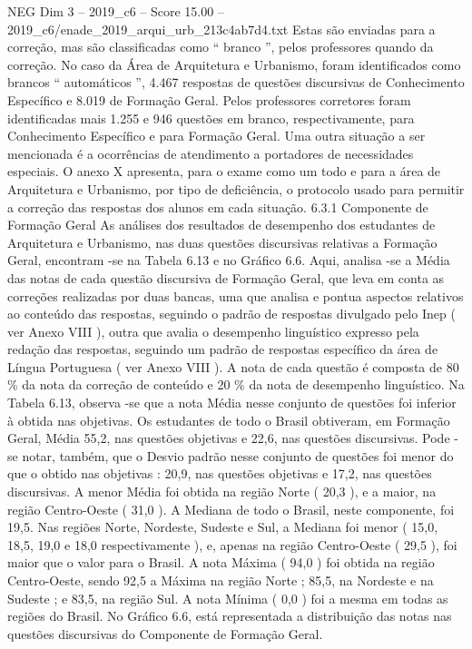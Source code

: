 \begin{textsample}{NEG Dim 3 – 2019\_c6 – Score 15.00 – 2019\_c6/enade\_2019\_arqui\_urb\_213c4ab7d4.txt}
Estas são enviadas para a correção, mas são classificadas como “ branco ”, pelos professores quando da correção.
No caso da Área de Arquitetura e Urbanismo, foram identificados como brancos “ automáticos ”, 4.467 respostas de questões discursivas de Conhecimento Específico e 8.019 de Formação Geral.
Pelos professores corretores foram identificadas mais 1.255 e 946 questões em branco, respectivamente, para Conhecimento Específico e para Formação Geral.
Uma outra situação a ser mencionada é a ocorrências de atendimento a portadores de necessidades especiais.
O anexo X apresenta, para o exame como um todo e para a área de Arquitetura e Urbanismo, por tipo de deficiência, o protocolo usado para permitir a correção das respostas dos alunos em cada situação. 6.3.1 Componente de Formação Geral As análises dos resultados de desempenho dos estudantes de Arquitetura e Urbanismo, nas duas questões discursivas relativas a Formação Geral, encontram -se na Tabela 6.13 e no Gráfico 6.6.
Aqui, analisa -se a Média das notas de cada questão discursiva de Formação Geral, que leva em conta as correções realizadas por duas bancas, uma que analisa e pontua aspectos relativos ao conteúdo das respostas, seguindo o padrão de respostas divulgado pelo Inep ( ver Anexo VIII ), outra que avalia o desempenho linguístico expresso pela redação das respostas, seguindo um padrão de respostas específico da área de Língua Portuguesa ( ver Anexo VIII ).
A nota de cada questão é composta de 80 \% da nota da correção de conteúdo e 20 \% da nota de desempenho linguístico.
Na Tabela 6.13, observa -se que a nota Média nesse conjunto de questões foi inferior à obtida nas objetivas.
Os estudantes de todo o Brasil obtiveram, em Formação Geral, Média 55,2, nas questões objetivas e 22,6, nas questões discursivas.
Pode -se notar, também, que o Desvio padrão nesse conjunto de questões foi menor do que o obtido nas objetivas : 20,9, nas questões objetivas e 17,2, nas questões discursivas.
A menor Média foi obtida na região Norte ( 20,3 ), e a maior, na região Centro-Oeste ( 31,0 ).
A Mediana de todo o Brasil, neste componente, foi 19,5.
Nas regiões Norte, Nordeste, Sudeste e Sul, a Mediana foi menor ( 15,0, 18,5, 19,0 e 18,0 respectivamente ), e, apenas na região Centro-Oeste ( 29,5 ), foi maior que o valor para o Brasil.
A nota Máxima ( 94,0 ) foi obtida na região Centro-Oeste, sendo 92,5 a Máxima na região Norte ; 85,5, na Nordeste e na Sudeste ; e 83,5, na região Sul.
A nota Mínima ( 0,0 ) foi a mesma em todas as regiões do Brasil.
No Gráfico 6.6, está representada a distribuição das notas nas questões discursivas do Componente de Formação Geral.

\end{textsample}
